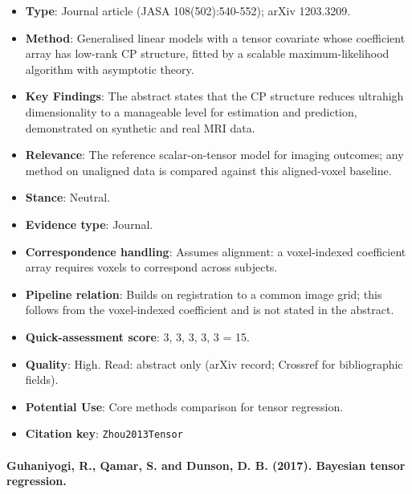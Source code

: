 \documentclass[journal,onecolumn]{IEEEtran}
\begin{document}
\begin{itemize}

\item{} \textbf{Type}: Journal article (JASA 108(502):540-552); arXiv 1203.3209.

\item{} \textbf{Method}: Generalised linear models with a tensor covariate whose coefficient array has low-rank CP structure, fitted by a scalable maximum-likelihood algorithm with asymptotic theory.

\item{} \textbf{Key Findings}: The abstract states that the CP structure reduces ultrahigh dimensionality to a manageable level for estimation and prediction, demonstrated on synthetic and real MRI data.

\item{} \textbf{Relevance}: The reference scalar-on-tensor model for imaging outcomes; any method on unaligned data is compared against this aligned-voxel baseline.

\item{} \textbf{Stance}: Neutral.

\item{} \textbf{Evidence type}: Journal.

\item{} \textbf{Correspondence handling}: Assumes alignment: a voxel-indexed coefficient array requires voxels to correspond across subjects.

\item{} \textbf{Pipeline relation}: Builds on registration to a common image grid; this follows from the voxel-indexed coefficient and is not stated in the abstract.

\item{} \textbf{Quick-assessment score}: 3, 3, 3, 3, 3 = 15.

\item{} \textbf{Quality}: High. Read: abstract only (arXiv record; Crossref for bibliographic fields).

\item{} \textbf{Potential Use}: Core methods comparison for tensor regression.

\item{} \textbf{Citation key}: \texttt{Zhou2013Tensor}

\end{itemize}

\paragraph{Guhaniyogi, R., Qamar, S. and Dunson, D. B. (2017). Bayesian tensor regression.~\cite{Guhaniyogi2017Bayesian}}\mbox{}
\end{document}
